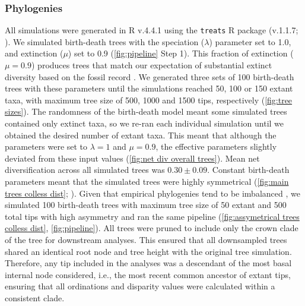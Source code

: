 \documentclass[11pt, a4paper]{article}
\begin{document}
\subsubsection{Phylogenies}
All simulations were generated  in R v.4.4.1 \citep{Rlanguage} using the \texttt{treats} R package (v.1.1.7; \citealp{guillerme2024treats}).
We simulated birth-death trees with the speciation ($\lambda$) parameter set to 1.0, and extinction ($\mu$) set to 0.9 (\autoref{fig:pipeline} Step 1).
This fraction of extinction ($\mu = 0.9$) produces trees that match our expectation of substantial extinct diversity based on the fossil record \citep{scholl2016diversification,pires2018diversification, henao2019macroevolutionary,morlon2024phylogenetic}.
We generated three sets of 100 birth-death trees with these parameters until the simulations reached 50, 100 or 150 extant taxa, with maximum tree size of 500, 1000 and 1500 tips, respectively (\autoref{fig:tree sizes}).
The randomness of the birth-death model meant some simulated trees contained only extinct taxa, so we re-ran each individual simulation until we obtained the desired number of extant taxa.
This meant that although the parameters were set to $\lambda = 1$ and $\mu = 0.9$, the effective parameters slightly deviated from these input values (\autoref{fig:net div overall trees}).
Mean net diversification across all simulated trees was $0.30\pm0.09$.
Constant birth-death parameters meant that the simulated trees were highly symmetrical (\autoref{fig:main trees colless dist}; \citealp{khurana2024limits}).
Given that empirical phylogenies tend to be imbalanced \citep{mooers1997inferring, harcourt2001imbalance}, we simulated 100 birth-death trees with maximum tree size of 50 extant and 500 total tips with high asymmetry and ran the same pipeline (\autoref{fig:assymetrical trees colless dist}, \autoref{fig:pipeline}).
All trees were pruned to include only the crown clade of the tree for downstream analyses.
This ensured that all downsampled trees shared an identical root node and tree height with the original tree simulation.
Therefore, any tip included in the analyses was a descendant of the most basal internal node considered, i.e., the most recent common ancestor of extant tips, ensuring that all ordinations and disparity values were calculated within a consistent clade. %
\end{document}
